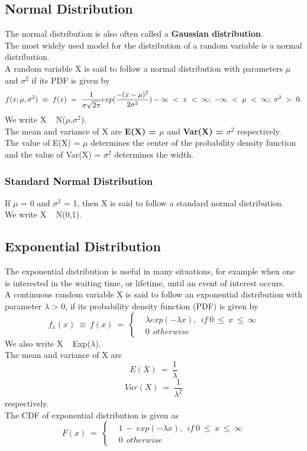 \subsection*{Normal Distribution}
The normal distribution is also often called a \textbf{Gaussian distribution}.\\
The most widely used model for the distribution of a random
variable is a normal distribution.\\
A random variable X is said to follow a normal distribution with
parameters $\mu$ and $\sigma^2$ if its PDF is given by
\begin{equation}
    f(x;\mu,\sigma^2)\ \equiv\ f(x)\ =\ \frac{1}{\sigma\sqrt{2\pi}}exp(\frac{-(x-\mu)^2}{2\sigma^2}) \\
    -\infty\ <\ x\ <\ \infty;\ -\infty\ <\ \mu\ <\ \infty;\ \sigma^2\ >\ 0.
\end{equation}
We write X ~ N($\mu$,$\sigma^2$).\\
The mean and variance of X are \textbf{E(X) = $\mu$} and \textbf{Var(X) = $\sigma^2$} respectively.\\
The value of E(X) = $\mu$ determines the center of the probability density function and the value of Var(X) = $\sigma^2$ determines the width.
\subsubsection*{Standard Normal Distribution}
If $\mu$ = 0 and $\sigma^2$ = 1, then X is said to follow a standard normal distribution.\\
We write X ~ N(0,1).

\subsection*{Exponential Distribution}
The exponential distribution is useful in many situations, for example
when one is interested in the waiting time, or lifetime, until an event
of interest occurs.\\
A continuous random variable X is said to follow an exponential
distribution with parameter $\lambda$ > 0, if its probability density function
(PDF) is given by
\begin{equation}
    f_x(x)\ \equiv\ f(x)\ =\
    \begin{cases}
    & \lambda exp(-\lambda x),\ \ if\ 0\ \leq\ x\ \leq\ \infty\\
    & 0\ \ otherwise
    \end{cases}
\end{equation}
We also write X ~ Exp($\lambda$).\\
The mean and variance of X are 
\[ E(X)\ =\ \frac{1}{\lambda}\]
\[ Var(X)\ =\ \frac{1}{\lambda^2}\]
respectively.\\
The CDF of exponential distribution is given as
\begin{equation}
    F(x)\ =\
    \begin{cases}
    & 1\ -\ exp(-\lambda x),\ \ if\ 0\ \leq\ x\ \leq\ \infty\\
    & 0\ \ otherwise
    \end{cases}
\end{equation}

